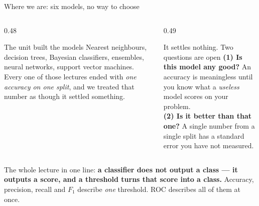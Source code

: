 \documentclass[aspectratio=169]{beamer}
\begin{document}
\begin{frame}[shrink=6]{Where we are: six models, no way to choose}
  \begin{columns}[T]
    \begin{column}{0.48\textwidth}
      \begin{block}{The unit built the models}
        Nearest neighbours, decision trees, Bayesian classifiers, ensembles,
        neural networks, support vector machines. Every one of those lectures
        ended with \emph{one accuracy on one split}, and we treated that
        number as though it settled something.
      \end{block}
    \end{column}
    \begin{column}{0.49\textwidth}
      \begin{alertblock}{It settles nothing. Two questions are open}
        \textbf{(1) Is this model any good?} An accuracy is meaningless until
        you know what a \emph{useless} model scores on your problem.\\[0.3em]
        \textbf{(2) Is it better than that one?} A single number from a single
        split has a standard error you have not measured.
      \end{alertblock}
    \end{column}
  \end{columns}
  \vspace{0.2em}
  \begin{exampleblock}{}
    \centering\small
    The whole lecture in one line: \textbf{a classifier does not output a
    class --- it outputs a score, and a threshold turns that score into a
    class.} Accuracy, precision, recall and $F_1$ describe \emph{one}
    threshold. ROC describes all of them at once.
  \end{exampleblock}
\end{frame}
\end{document}
